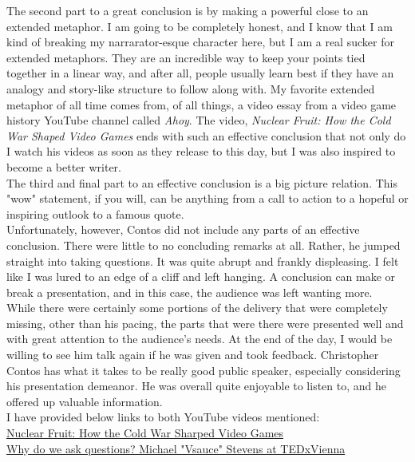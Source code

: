 \documentclass[]{mla}
\begin{document}
    The second part to a great conclusion is by making a powerful close to an extended metaphor. I am going to be completely honest, and I know that I am kind of breaking my narrarator-esque character here, but I am a real sucker for extended metaphors. They are an incredible way to keep your points tied together in a linear way, and after all, people usually learn best if they have an analogy and story-like structure to follow along with. My favorite extended metaphor of all time comes from, of all things, a video essay from a video game history YouTube channel called \textit{Ahoy}. The video, \textit{Nuclear Fruit: How the Cold War Shaped Video Games} ends with such an effective conclusion that not only do I watch his videos as soon as they release to this day, but I was also inspired to become a better writer.
    \\
    The third and final part to an effective conclusion is a big picture relation. This "wow" statement, if you will, can be anything from a call to action to a hopeful or inspiring outlook to a famous quote.
    \\
    Unfortunately, however, Contos did not include any parts of an effective conclusion. There were little to no concluding remarks at all. Rather, he jumped straight into taking questions. It was quite abrupt and frankly displeasing. I felt like I was lured to an edge of a cliff and left hanging. A conclusion can make or break a presentation, and in this case, the audience was left wanting more.
    \\
    While there were certainly some portions of the delivery that were completely missing, other than his pacing, the parts that were there were presented well and with great attention to the audience's needs. At the end of the day, I would be willing to see him talk again if he was given and took feedback. Christopher Contos has what it takes to be really good public speaker, especially considering his presentation demeanor. He was overall quite enjoyable to listen to, and he offered up valuable information.
    \\
    \vspace*{\fill}
    \noindent
    I have provided below links to both YouTube videos mentioned:
    \\
    \href{https://www.youtube.com/watch?v=15dxuAbTC0A}{Nuclear Fruit: How the Cold War Sharped Video Games}
    \\
    \href{https://youtu.be/u9hauSrihYQ}{Why do we ask questions? Michael "Vsauce" Stevens at TEDxVienna}
    
\end{document}
